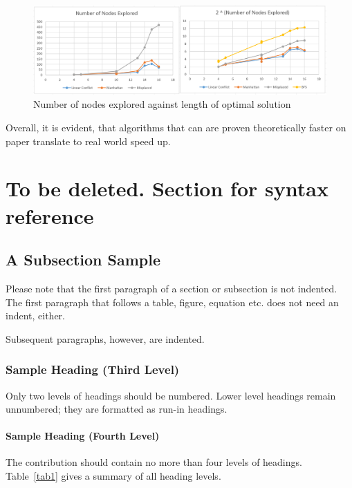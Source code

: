\documentclass[runningheads]{llncs}
\begin{document}
\begin{figure}
\includegraphics[width=\textwidth]{Results.PNG}
\caption{Number of nodes explored against length of optimal solution} \label{fig1}
\end{figure}

Overall, it is evident, that algorithms that can are proven theoretically faster on paper translate to real world speed up. 

\newpage

\section{To be deleted. Section for syntax reference}
\subsection{A Subsection Sample}
Please note that the first paragraph of a section or subsection is
not indented. The first paragraph that follows a table, figure,
equation etc. does not need an indent, either.

Subsequent paragraphs, however, are indented.

\subsubsection{Sample Heading (Third Level)} Only two levels of
headings should be numbered. Lower level headings remain unnumbered;
they are formatted as run-in headings.

\paragraph{Sample Heading (Fourth Level)}
The contribution should contain no more than four levels of
headings. Table~\ref{tab1} gives a summary of all heading levels.
\end{document}
